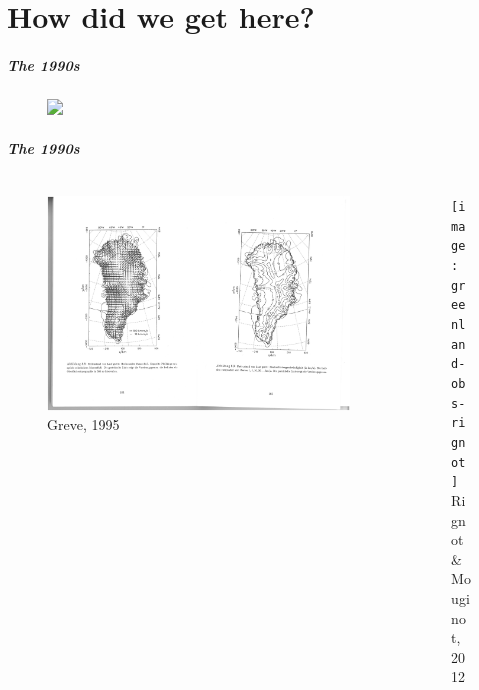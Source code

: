 \documentclass[hide notes,intlimits]{beamer}
\begin{document}
\part{How did we get here?}
\frame{\partpage}


\begin{frame}
  \frametitle{The 1990s}
      \begin{figure}
        \includegraphics<1>[width=\textwidth]{greve-1995}
      \end{figure}
\end{frame}

\begin{frame}
  \frametitle{The 1990s}
      \vspace{-2em}
  \begin{columns}[c]
    \begin{column}{.5\linewidth}
    \begin{figure}
      \includegraphics[height=0.75\textheight]{greve_1995_flow}\\
      \tiny{Greve, 1995}
    \end{figure}
    \end{column}
    \begin{column}{.4\linewidth}
      \begin{figure}
      \texttt{[image: greenland-obs-rignot]}\\
      \tiny{Rignot \& Mouginot, 2012}
      \end{figure}
    \end{column}
  \end{columns}
\end{frame}
\end{document}
